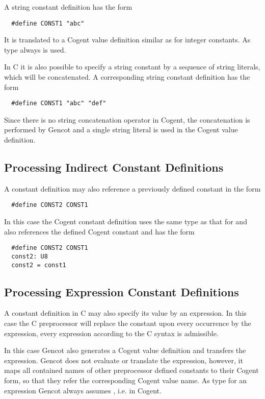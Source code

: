 A string constant definition has the form
\begin{verbatim}
  #define CONST1 "abc"
\end{verbatim}
It is translated to a Cogent value definition similar as for integer constants. As type always 
is used.

In C it is also possible to specify a string constant by a sequence of string literals, which will be concatenated.
A corresponding string constant definition has the form
\begin{verbatim}
  #define CONST1 "abc" "def"
\end{verbatim}
Since there is no string concatenation operator in Cogent, the concatenation is performed by Gencot and
a single string literal is used in the Cogent value definition.

\subsection{Processing Indirect Constant Definitions}

A constant definition may also reference a previously defined constant in the form 
\begin{verbatim}
  #define CONST2 CONST1
\end{verbatim}

In this case the Cogent constant definition uses the same type as that for  and
also references the defined Cogent constant and has the form
\begin{verbatim}
  #define CONST2 CONST1
  const2: U8
  const2 = const1
\end{verbatim}

\subsection{Processing Expression Constant Definitions}

A constant definition in C may also specify its value by an expression. In this case the C preprocessor will replace
the constant upon every occurrence by the expression, every expression according to the C syntax is admissible. 

In this case Gencot also generates a Cogent value definition and transfers the expression. Gencot does not evaluate
or translate the expression, however, it maps all contained names of other preprocessor defined constants to their
Cogent form, so that they refer the corresponding Cogent value name. As type for an expression Gencot always assumes
, i.e.  in Cogent.

